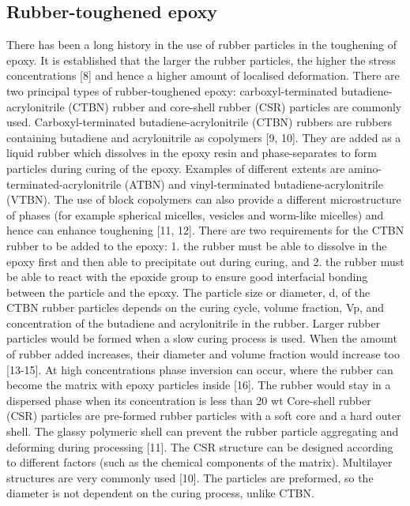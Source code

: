 \documentclass[numbers=noendperiod,chapterprefix=on]{icldt} %
\begin{document}
\subsection{Rubber-toughened epoxy}
There has been a long history in the use of rubber particles in the toughening of epoxy. It is established that the larger the rubber particles, the higher the stress concentrations [8] and hence a higher amount of localised deformation. There are two principal types of rubber-toughened epoxy: carboxyl-terminated butadiene-acrylonitrile (CTBN) rubber and core-shell rubber (CSR) particles are commonly used. 
Carboxyl-terminated butadiene-acrylonitrile (CTBN) rubbers are rubbers containing butadiene and acrylonitrile as copolymers [9, 10]. They are added as a liquid rubber which dissolves in the epoxy resin and phase-separates to form particles during curing of the epoxy. Examples of different extents are amino-terminated-acrylonitrile (ATBN) and vinyl-terminated butadiene-acrylonitrile (VTBN). The use of block copolymers can also provide a different microstructure of phases (for example spherical micelles, vesicles and worm-like micelles) and hence can enhance toughening [11, 12]. 
There are two requirements for the CTBN rubber to be added to the epoxy: 1. the rubber must be able to dissolve in the epoxy first and then able to precipitate out during curing, and 2. the rubber must be able to react with the epoxide group to ensure good interfacial bonding between the particle and the epoxy. The particle size or diameter, d, of the CTBN rubber particles depends on the curing cycle, volume fraction, Vp, and concentration of the butadiene and acrylonitrile in the rubber. Larger rubber particles would be formed when a slow curing process is used. When the amount of rubber added increases, their diameter and volume fraction would increase too [13-15].
At high concentrations phase inversion can occur, where the rubber can become the matrix with epoxy particles inside [16]. The rubber would stay in a dispersed phase when its concentration is less than 20 wt%
Core-shell rubber (CSR) particles are pre-formed rubber particles with a soft core and a hard outer shell. The glassy polymeric shell can prevent the rubber particle aggregating and deforming during processing [11]. The CSR structure can be designed according to different factors (such as the chemical components of the matrix). Multilayer structures are very commonly used [10]. The particles are preformed, so the diameter is not dependent on the curing process, unlike CTBN. 
\end{document}
